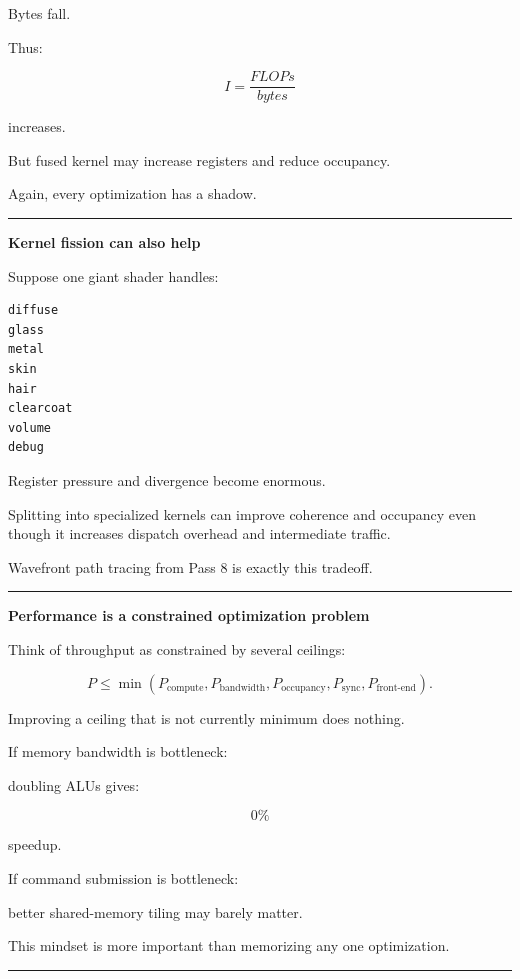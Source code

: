 Bytes fall.

Thus:

\[
\boxed{
I=\frac{FLOPs}{bytes}
}
\]

increases.

But fused kernel may increase registers and reduce occupancy.

Again, every optimization has a shadow.

\begin{center}\rule{0.5\linewidth}{0.5pt}\end{center}

\textbf{Kernel fission can also help}

Suppose one giant shader handles:

\protect{}\label{p10-mega}%
\begin{verbatim}
diffuse
glass
metal
skin
hair
clearcoat
volume
debug
\end{verbatim}

Register pressure and divergence become enormous.

Splitting into specialized kernels can improve coherence and occupancy even though it increases dispatch overhead and intermediate traffic.

Wavefront path tracing from Pass 8 is exactly this tradeoff.

\begin{center}\rule{0.5\linewidth}{0.5pt}\end{center}

\textbf{Performance is a constrained optimization problem}

Think of throughput as constrained by several ceilings:

\[
\boxed{
P
\le
\min(
P_{\text{compute}},
P_{\text{bandwidth}},
P_{\text{occupancy}},
P_{\text{sync}},
P_{\text{front-end}}
).
}
\]

Improving a ceiling that is not currently minimum does nothing.

If memory bandwidth is bottleneck:

doubling ALUs gives:

\[
0\%
\]

speedup.

If command submission is bottleneck:

better shared-memory tiling may barely matter.

This mindset is more important than memorizing any one optimization.

\begin{center}\rule{0.5\linewidth}{0.5pt}\end{center}

